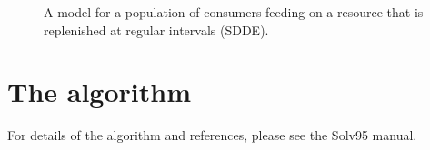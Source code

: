 \documentclass[10pt,a4paper] {article}
\begin{document}
\begin{figure}[bp]
\begin{center}
\caption{A model for a population of consumers feeding on a resource that is replenished at regular intervals (SDDE).}\label{fig:sdde}
\end{center}
\end{figure}

\section{The algorithm}

For details of the algorithm and references, please see the Solv95 manual.
  
\end{document}
